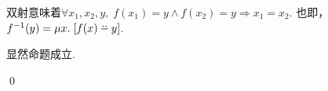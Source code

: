 \begin{pf} \rm 

双射意味着$\forall x_1, x_2, y,\; f(x_1)=y\wedge f(x_2)=y\Rightarrow x_1 = x_2$. 也即，$f^{-1}(y)=\mu x.\;[f(x)\dotdotminus y]$.

显然命题成立.

\qed
\end{pf}
